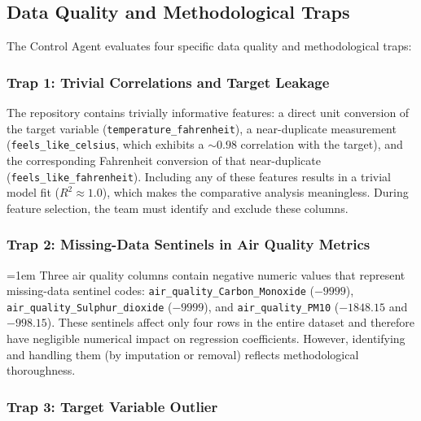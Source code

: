 \subsection{Data Quality and Methodological Traps}
\label{subsec:long-task-quality-traps}

The Control Agent evaluates four specific data quality and methodological traps:

\subsubsection{Trap 1: Trivial Correlations and Target Leakage}
\label{subsubsec:trap-target-leakage}

The repository contains trivially informative features: a direct unit conversion of the target variable (\texttt{temperature\_fahrenheit}), a near-duplicate measurement (\texttt{feels\_like\_celsius}, which exhibits a $\sim 0.98$ correlation with the target), and the corresponding Fahrenheit conversion of that near-duplicate (\texttt{feels\_like\_fahrenheit}).
Including any of these features results in a trivial model fit ($R^2 \approx 1.0$), which makes the comparative analysis meaningless.
During feature selection, the team must identify and exclude these columns.

\subsubsection{Trap 2: Missing-Data Sentinels in Air Quality Metrics}
\label{subsubsec:trap-missing-data-sentinels}

{
\emergencystretch=1em
Three air quality columns contain negative numeric values that represent missing-data sentinel codes:
\texttt{air\_quality\_\allowbreak Carbon\_\allowbreak Monoxide} ($-9999$), \texttt{air\_quality\_\allowbreak Sulphur\_\allowbreak dioxide} ($-9999$), and \texttt{air\_quality\_\allowbreak PM10} ($-1848.15$ and $-998.15$).
These sentinels affect only four rows in the entire dataset and therefore have negligible numerical impact on regression coefficients.
However, identifying and handling them (by imputation or removal) reflects methodological thoroughness.\par}

\subsubsection{Trap 3: Target Variable Outlier}
\label{subsubsec:trap-target-outlier}


